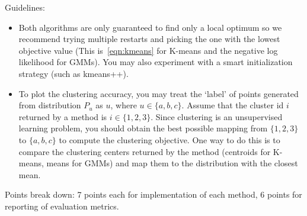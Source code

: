 \documentclass[a4paper]{article}
\newcounter{thm}
\theoremstyle{definition}
\begin{document}
Guidelines:
\begin{itemize} 
\item Both algorithms are only guaranteed to find only a local optimum so we recommend trying multiple
restarts and picking the one with the lowest objective value (This is~\eqref{eqn:kmeans} for K-means and the negative log likelihood for GMMs).
You may also experiment with a smart initialization
strategy (such as kmeans++).

\item
To plot the clustering accuracy,  you may treat the `label' of points generated from distribution
$P_u$ as $u$, where $u\in \{a, b, c\}$.
Assume that the cluster id $i$ returned by a method is $i\in \{1, 2, 3\}$.
Since clustering is an unsupervised learning problem, you should obtain the best possible mapping
from $\{1, 2, 3\}$ to $\{a, b, c\}$ to compute the clustering objective.
One way to do this is to compare the clustering centers returned by the method (centroids for
K-means, means for GMMs) and map them to the distribution with the closest mean.

\end{itemize}

Points break down: 7 points each for implementation of each method, 6 points for reporting of
evaluation metrics.
\end{document}
